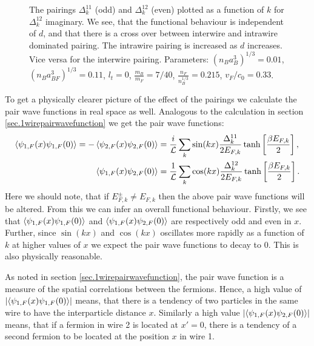 \begin{figure} 
\begin{center}  
  
\caption{The pairings $\Delta^{11}_k$ (odd) and $\Delta^{12}_k$ (even) plotted as a function of $k$ for $\Delta^{12}_k$ imaginary. We see, that the functional behaviour is independent of $d$, and that there is a cross over between interwire and intrawire dominated pairing. The intrawire pairing is increased as $d$ increases. Vice versa for the interwire pairing. Parameters: $(n_Ba_B^3)^{1/3} = 0.01$, $(n_Ba_{BF}^3)^{1/3} = 0.11$, $l_t = 0$, $\frac{m_B}{m_F} = 7/40$, $\frac{n_F}{n_B^{1/3}} = 0.215$, $v_F/c_0 = 0.33$. }  
\label{fig.pairingkdependT0dvaried}  
\end{center}    
\end{figure}

To get a physically clearer picture of the effect of the pairings we calculate the pair wave functions in real space as well. Analogous to the calculation in section \ref{sec.1wirepairwavefunction} we get the pair wave functions:
\begin{align}
\braket{\psi_{1,F}(x)\psi_{1,F}(0)} = - \braket{\psi_{2,F}(x)\psi_{2,F}(0)} &= \frac{i}{\mathcal{L}}\sum_k \sin(kx) \frac{\Delta^{11}_k}{2E_{F,k}}\tanh\left[\frac{ \beta E_{F,k} }{2}\right], \nonumber \\
\braket{\psi_{1,F}(x)\psi_{2,F}(0)} &= \frac{1}{\mathcal{L}}\sum_k \cos(kx) \frac{\Delta^{12}_k}{2E_{F,k}}\tanh\left[\frac{ \beta E_{F,k} }{2}\right].
\label{eq.2wirespairwavefunctionsDelta12imaginary}
\end{align} 
Here we should note, that if $E^\pm_{F,k} \neq E_{F,k}$ then the above pair wave functions will be altered. From this we can infer an overall functional behaviour. Firstly, we see that $\braket{\psi_{1,F}(x)\psi_{1,F}(0)}$ and $\braket{\psi_{1,F}(x)\psi_{2,F}(0)}$ are respectively odd and even in $x$. Further, since $\sin(kx)$ and $\cos(kx)$ oscillates more rapidly as a function of $k$ at higher values of $x$ we expect the pair wave functions to decay to 0. This is also physically reasonable.  

As noted in section \ref{sec.1wirepairwavefunction}, the pair wave function is a measure of the spatial correlations between the fermions. Hence, a high value of $\left|\braket{\psi_{1,F}(x)\psi_{1,F}(0)}\right|$ means, that there is a tendency of two particles in the same wire to have the interparticle distance $x$. Similarly a high value $\left|\braket{\psi_{1,F}(x)\psi_{2,F}(0)}\right|$ means, that if a fermion in wire 2 is located at $x' = 0$, there is a tendency of a second fermion to be located at the position $x$ in wire 1.  

